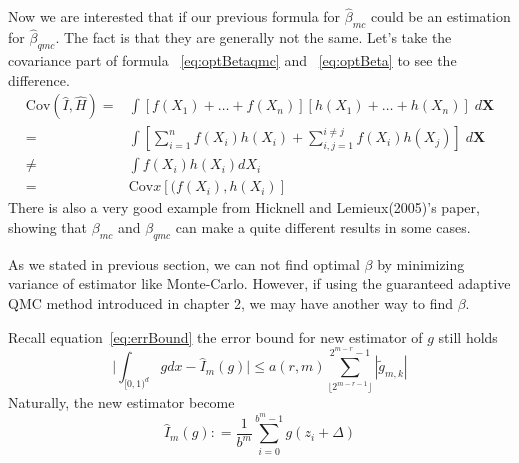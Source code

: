 Now we are interested that if our previous formula for $\hat{\beta}_{mc}$ could be an estimation for $\hat{\beta}_{qmc}$. The fact is that they are generally not the same. Let's take the covariance part of formula ~\eqref{eq:optBetaqmc} and ~\eqref{eq:optBeta} to see the difference. 
\begin{align*}
    \mathrm{Cov}(\hat{I}, \hat{H})=&\int [f(X_1)+\dots+f(X_n)][h(X_1)+\dots+h(X_n)]\; d\mathbf{X}\\
    =&\int [\sum_{i=1}^{n}f(X_i)h(X_i) + \sum_{i,j=1}^{i\neq j}f(X_i)h(X_j)]\; d\mathbf{X}\\
    \neq&\int f(X_i)h(X_i)dX_i\\
    =&\mathrm{Cov}x[(f(X_i),h(X_i)]
\end{align*}
There is also a very good example from Hicknell and Lemieux(2005)\cite{hickernell2005control}'s paper, showing that $\beta_{mc}$ and $\beta_{qmc}$ can make a quite different results in some cases. 



As we stated in previous section, we can not find optimal $\beta$ by minimizing variance of estimator like Monte-Carlo. 
However, if using the guaranteed adaptive QMC method introduced in chapter 2, we may have another way to find $\beta$.

Recall equation~\eqref{eq:errBound} the error bound for new estimator of $g$ still holds
\begin{equation}\label{eq:qmccvErr}
	\Big|\int_{[0,1)^d}gdx - \hat{I}_m(g)\Big| \leq a(r,m) \sum_{\lfloor 2^{m-r-1} \rfloor}^{2^{m-r}-1} |\tilde{g}_{m,k}|
\end{equation}
Naturally, the new estimator become
\begin{equation}\label{eq:estcv}
    \hat{I}_m({g}): = \frac{1}{b^m}\sum_{i=0}^{b^m-1}g(z_i+\Delta)
\end{equation}


